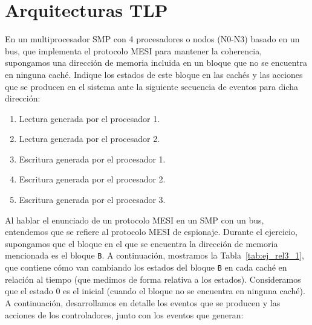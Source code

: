 \section{Arquitecturas TLP}

\begin{ejercicio}
    En un multiprocesador SMP con 4 procesadores o nodos (N0-N3) basado en un bus, que implementa el protocolo MESI para mantener la coherencia, supongamos una dirección de memoria incluida en un bloque que no se encuentra en ninguna caché. Indique los estados de este bloque en las cachés y las acciones que se producen en el sistema ante la siguiente secuencia de eventos para dicha dirección:
    \begin{enumerate}
        \item Lectura generada por el procesador 1.
        \item Lectura generada por el procesador 2.
        \item Escritura generada por el procesador 1.
        \item Escritura generada por el procesador 2.
        \item Escritura generada por el procesador 3.
    \end{enumerate}

    Al hablar el enunciado de un protocolo MESI en un SMP con un bus, entendemos que se refiere al protocolo MESI de espionaje. Durante el ejercicio, supongamos que el bloque en el que se encuentra la dirección de memoria mencionada es el bloque \verb|B|. A continuación, mostramos la Tabla~\ref{tab:ej_rel3_1}, que contiene cómo van cambiando los estados del bloque \verb|B| en cada caché en relación al tiempo (que medimos de forma relativa a los estados). Consideramos que el estado 0 es el inicial (cuando el bloque no se encuentra en ninguna caché). A continuación, desarrollamos en detalle los eventos que se producen y las acciones de los controladores, junto con los eventos que generan:\\


\end{ejercicio}
